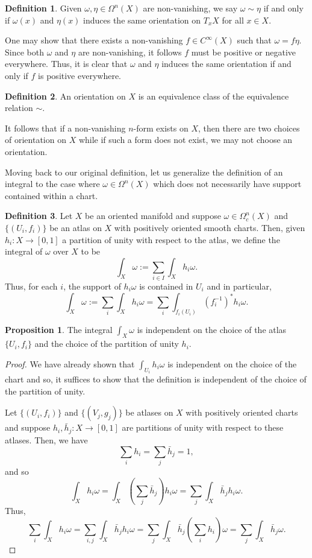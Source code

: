 \documentclass[]{article}
\theoremstyle{definition}
\theoremstyle{definition}
\newtheorem{definition}{Definition}[section]
\newtheorem{proposition}{Proposition}[section]
\begin{document}
\begin{definition}
  Given \(\omega, \eta \in \Omega^n(X)\) are non-vanishing, we say 
  \(\omega \sim \eta\) if and only if \(\omega(x)\) and \(\eta(x)\) induces 
  the same orientation on \(T_x X\) for all \(x \in X\). 
\end{definition}

One may show that there exists a non-vanishing \(f \in C^\infty(X)\) such that 
\(\omega = f\eta\). Since both \(\omega\) and \(\eta\) are non-vanishing, it 
follows \(f\) must be positive or negative everywhere. Thus, it is clear that 
\(\omega\) and \(\eta\) induces the same orientation if and only if \(f\) is 
positive everywhere. 

\begin{definition}
  An orientation on \(X\) is an equivalence class of the equivalence relation 
  \(\sim\).
\end{definition}

It follows that if a non-vanishing \(n\)-form exists on \(X\), then there 
are two choices of orientation on \(X\) while if such a form does not exist, 
we may not choose an orientation. 

Moving back to our original definition, let us generalize the definition of an 
integral to the case where \(\omega \in \Omega^n(X)\) which does not necessarily 
have support contained within a chart.

\begin{definition}
  Let \(X\) be an oriented manifold and suppose \(\omega \in \Omega^n_c(X)\) and 
  \(\{(U_i, f_i)\}\) be an atlas on \(X\) with positively oriented smooth charts. 
  Then, given \(h_i : X \to [0, 1]\) a partition of unity with respect to the 
  atlas, we define the integral of \(\omega\) over \(X\) to be 
  \[\int_X \omega := \sum_{i \in I} \int_X h_i \omega.\]
  Thus, for each \(i\), the support of \(h_i\omega\) is contained in \(U_i\) 
  and in particular, 
  \[\int_X \omega := \sum_i \int_X h_i \omega = \sum_i \int_{f_i(U_i)} (f_i^{-1})^* h_i \omega.\]
\end{definition}

\begin{proposition}
  The integral \(\int_X \omega\) is independent on the choice of the atlas 
  \(\{U_i, f_i\}\) and the choice of the partition of unity \(h_i\).
\end{proposition}
\begin{proof}
  We have already shown that \(\int_{U_i} h_i\omega\) is independent on the 
  choice of the chart and so, it suffices to show that the definition is 
  independent of the choice of the partition of unity.

  Let \(\{(U_i, f_i)\}\) and \(\{(V_j, g_j)\}\) be atlases on \(X\) with 
  positively oriented charts and suppose \(h_i, \bar h_j : X \to [0, 1]\) are 
  partitions of unity with respect to these atlases. Then, we have 
  \[\sum_i h_i = \sum_j \bar h_j = 1,\]
  and so 
  \[\int_X h_i \omega = \int_X \left(\sum_j \bar h_j\right) h_i \omega = 
  \sum_j \int_X \bar h_j h_i \omega.\]
  Thus, 
  \[\sum_i \int_X h_i \omega = \sum_{i, j}\int_X \bar h_j h_i \omega = 
  \sum_j \int_X \bar h_j \left(\sum_i h_i\right)\omega = \sum_j \int_X \bar h_j \omega.\]
\end{proof}
\end{document}
